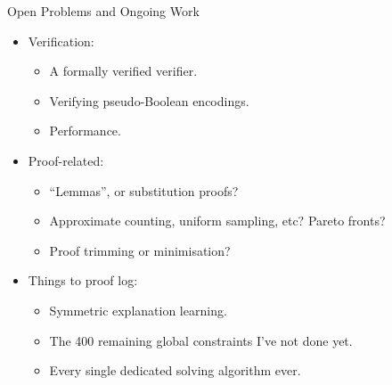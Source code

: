 \documentclass{beamer}
\begin{document}
\begin{frame}{Open Problems and Ongoing Work}
    \begin{itemize}
        \item Verification:
            \begin{itemize}
                \item A formally verified verifier.
                \item Verifying pseudo-Boolean encodings.
                \item Performance.
            \end{itemize}
        \item Proof-related:
            \begin{itemize}
                \item ``Lemmas'', or substitution proofs?
                \item Approximate counting, uniform sampling, etc? Pareto fronts?
                \item Proof trimming or minimisation?
            \end{itemize}
        \item Things to proof log:
            \begin{itemize}
                \item Symmetric explanation learning.
                \item The 400 remaining global constraints I've not done yet.
                \item Every single dedicated solving algorithm ever.
            \end{itemize}
    \end{itemize}
\end{frame}
\end{document}
